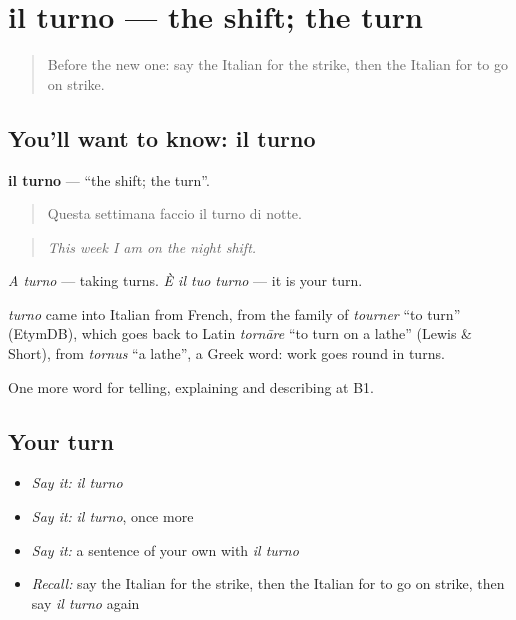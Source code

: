 \section[il turno]{il turno — the shift; the turn}

\label{lesson:IT-C359-turno}



\begin{quote}
Before the new one: say the Italian for the strike, then the Italian for to go on strike.
\end{quote}

\subsection*{You'll want to know: il turno}
\textbf{il turno} — \textquotedblleft{}the shift; the turn\textquotedblright{}.

\begin{quote}
Questa settimana faccio il turno di notte.
\end{quote}

\begin{quote}
\emph{This week I am on the night shift.}
\end{quote}

\emph{A turno} — taking turns. \emph{È il tuo turno} — it is your turn.

\begin{cousinweb}
\emph{turno} came into Italian from French, from the family of \emph{tourner} \textquotedblleft{}to turn\textquotedblright{} (EtymDB), which goes back to Latin \emph{tornāre} \textquotedblleft{}to turn on a lathe\textquotedblright{} (Lewis \& Short), from \emph{tornus} \textquotedblleft{}a lathe\textquotedblright{}, a Greek word: work goes round in turns.
\end{cousinweb}

\begin{grammarlens}[title={What you've built}]
One more word for telling, explaining and describing at B1.
\end{grammarlens}

\subsection*{Your turn}
\begin{itemize}
\raggedright
  \item \emph{Say it:} \emph{il turno}
  \item \emph{Say it:} \emph{il turno}, once more
  \item \emph{Say it:} a sentence of your own with \emph{il turno}
  \item \emph{Recall:} say the Italian for the strike, then the Italian for to go on strike, then say \emph{il turno} again
\end{itemize}

